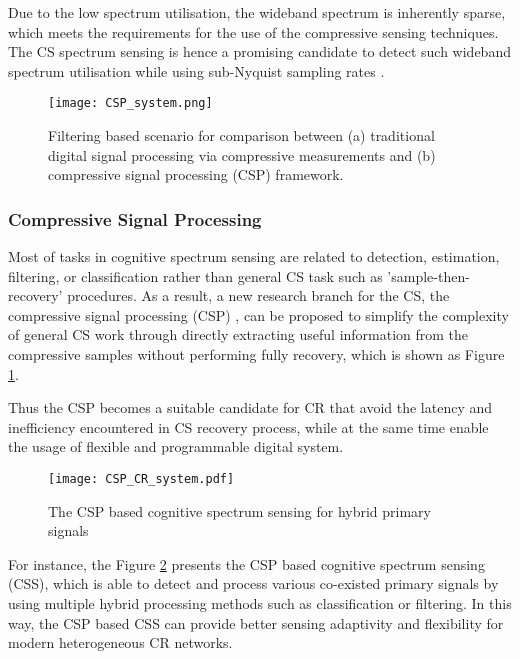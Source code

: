 Due to the low spectrum utilisation, the wideband spectrum is inherently sparse, which meets the requirements for the use of the  compressive sensing techniques. The CS spectrum sensing is hence a promising candidate to detect such wideband spectrum utilisation while using sub-Nyquist sampling rates \cite{sun2013wideband}.

\begin{figure}[tbh]
\begin{center}
\noindent
  \texttt{[image: CSP\_system.png]}
  \end{center}
    \caption{Filtering based scenario for comparison between (a) traditional digital signal processing via compressive measurements and (b) compressive signal processing (CSP)
framework.}\label{CSP_system}
\end{figure}

\subsubsection{Compressive Signal Processing}


Most of tasks in cognitive spectrum sensing are related to detection, estimation, filtering, or classification rather than general CS task such as 'sample-then-recovery' procedures. As a result, a new research branch for the CS, the
compressive signal processing (CSP) \cite{davenport2010signal}, can be proposed to simplify the complexity of general CS work through directly
extracting useful information from the compressive samples without performing fully recovery, which is shown as Figure \ref{CSP_system}. 

Thus the CSP becomes a suitable candidate for CR that avoid the latency and inefficiency encountered in CS recovery process, while at the same time enable the usage of flexible and programmable digital system. 

\begin{figure}[tbh]
\begin{center}
\noindent
  \texttt{[image: CSP\_CR\_system.pdf]}
  \end{center}
    \caption{The CSP based cognitive spectrum sensing for hybrid primary signals}\label{CSP_CR_system}
\end{figure}

For instance, the Figure \ref{CSP_CR_system} presents the CSP based cognitive spectrum sensing (CSS), which is able to detect and process various co-existed primary signals by using multiple hybrid processing methods such as classification or filtering. In this way, the CSP based CSS can provide better sensing adaptivity and flexibility for modern heterogeneous CR networks. 

